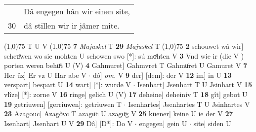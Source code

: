 \documentclass[8pt,a4paper,notitlepage]{article}
\begin{document}
\begin{table}[ht]
\begin{minipage}[t]{0.5\linewidth}
\begin{tabular}{rl}
 & Dâ engegen hân wir einen site,\\ 
30 & dâ stillen wir ir jâmer mite.\\ 
\end{tabular}
\scriptsize
\line(1,0){75} \newline
T U V \newline
\line(1,0){75} \newline
\textbf{7} \textit{Majuskel} T  \textbf{29} \textit{Majuskel} T  \newline
\line(1,0){75} \newline
\textbf{2} schouwet wâ wir] scheuͦwen wo sie mohten U schowen swo [*]: sú moͤhten V \textbf{3} Vnd wie ir (die V ) porten weren behuͦt U (V) \textbf{4} Gahmuret] Gahmvret T Gahmuͦret U Gamuret V \textbf{7} Her ûz] Er vz U Har abe V  $\cdot$ dô] \textit{om.} V \textbf{9} der] [dem]: der V \textbf{12} im] in U \textbf{13} verspart] bespart U \textbf{14} wart] [*]: wurde V  $\cdot$ Isenhart] Jsenhart T U Jsinhart V \textbf{15} vlîze] [*]: zorne V \textbf{16} ringe] gelich U (V) \textbf{17} deheine] deheiniv T \textbf{18} gît] gebot U \textbf{19} getriuwen] [gerriuwen]: getriuwen T  $\cdot$ Isenhartes] Jsenhartes T U Jsinhartes V \textbf{23} Azagouc] Azagôvc T azaguͦc U azagoͮg V \textbf{25} küener] keine U ie der V \textbf{27} Isenhart] Jsenhart U V \textbf{29} Dâ] [D*]: Do V  $\cdot$ engegen] gein U  $\cdot$ site] siden U \newline
\end{minipage}
\end{table}
\end{document}
